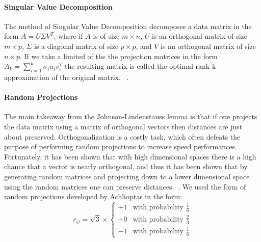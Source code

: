 \paragraph{Singular Value Decomposition} %
\label{par:singular_value_decomposition}
The method of Singular Value Decomposition decomposes a data matrix in the form $A = U \Sigma V^T$, where 
if $A$ is of size $m \times n$, $U$ is an orthogonal matrix of size $m \times p$, $\Sigma$ is a diagonal matrix of size $p \times p$, and $V$ is an orthogonal matrix of size $n \times p$. If we take a limited of the the projection matrices in the form $A_k = \sum_{i=1}^k\sigma_iu_iv_i^T$ the resulting matrix is called the optimal rank-k approximation of the original matrix. ~\cite{LecturePCA}.
\paragraph{Random Projections} %
\label{par:random_projections}
The main takeaway from the Johnson-Lindenstauss lemma is that if one projects the data matrix using a matrix of orthogonal vectors then distances are just about preserved. Orthogonalization is a costly task, which often defeats the purpose of performing random projections to increase speed performances. Fortunately, it has been shown that with high dimensional spaces there is a high chance that a vector is nearly orthogonal, and thus it has been shown that by generating random matrices and projecting down to a lower dimensional space using the random matrices one can preserve distances ~\cite{sulic2010dimensionality}. We used the form of random projections developed by Achlioptas in the form:
	\begin{equation}
		r_{ij} = \sqrt{3} \times \left\{
			\begin{array}{ll}
				+1  & \mbox{with probability } \frac{1}{6} \\
				+0  & \mbox{with probability } \frac{2}{3} \\
				-1  & \mbox{with probability } \frac{1}{6}
			\end{array}
		\right.
	\end{equation} ~\cite{achlioptas2001database}
